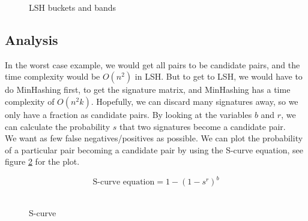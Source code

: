 \documentclass[a4paper,11pt]{article}
\begin{document}
\begin{figure}[!htpb]
\begin{center}
    \caption{LSH buckets and bands}
    \label{fig:lsh_buckets}
    \end{center}
\end{figure}

\subsection{Analysis}
In the worst case example, we would get all pairs to be candidate pairs, and the time complexity would be $O(n^2)$ in LSH. But to get to LSH, we would have to do MinHashing first, to get the signature matrix, and MinHashing has a time complexity of $O(n^2k)$. Hopefully, we can discard many signatures away, so we only have a fraction as candidate pairs. By looking at the variables $b$ and $r$, we can calculate the probability $s$ that two signatures become a candidate pair. \\


We want as few false negatives/positives as possible. We can plot the probability of a particular pair becoming a candidate pair by using the S-curve equation, see figure \ref{fig:scurve} for the plot.

\begin{equation}
    \text {S-curve equation} = 1 - (1 - s^r)^b 
\end{equation}\\

\begin{figure}[!htpb]
    \begin{center}
        
        \caption{S-curve}
        \label{fig:scurve}
    \end{center}
\end{figure}
\end{document}
